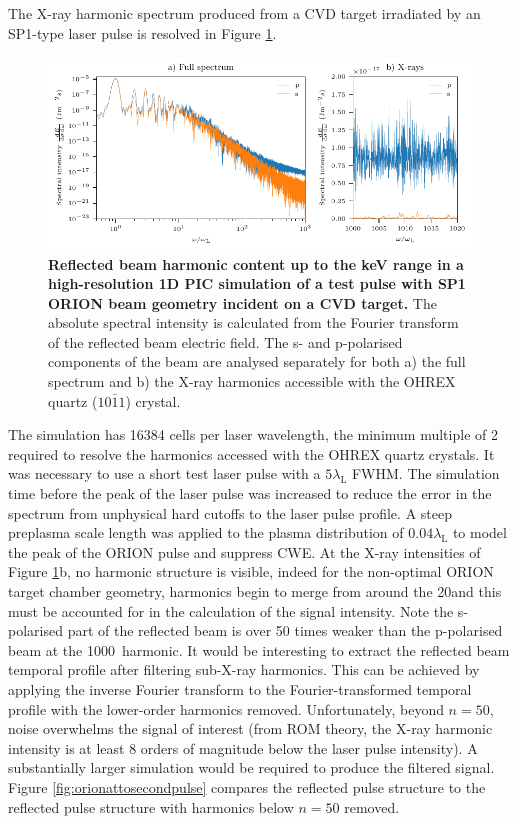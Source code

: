 The X-ray harmonic spectrum produced from a CVD target irradiated by an SP1-type laser pulse is resolved in Figure \ref{fig:orionxrayharmonics}.
\begin{figure}
	\centering
	\includegraphics{figures/orion/orion_xray_harmonics}
	\caption[Reflected beam harmonic content up to the keV range in a high-resolution 1D PIC simulation.]{\textbf{Reflected beam harmonic content up to the keV range in a high-resolution 1D PIC simulation of a test pulse with SP1 ORION beam geometry incident on a CVD target.} The absolute spectral intensity is calculated from the Fourier transform of the reflected beam electric field. The s- and p-polarised components of the beam are analysed separately for both a) the full spectrum and b) the X-ray harmonics accessible with the OHREX quartz ($10\bar{1}1$) crystal.}
	\label{fig:orionxrayharmonics}
\end{figure}
The simulation has 16384 cells per laser wavelength, the minimum multiple of 2 required to resolve the harmonics accessed with the OHREX quartz crystals. It was necessary to use a short test laser pulse with a $5\lambda_\mathrm{L}$ FWHM. The simulation time before the peak of the laser pulse was increased to reduce the error in the spectrum from unphysical hard cutoffs to the laser pulse profile. A steep preplasma scale length was applied to the plasma distribution of $0.04\lambda_\mathrm{L}$ to model the peak of the ORION pulse and suppress \ac{CWE}. 
At the X-ray intensities of Figure \ref{fig:orionxrayharmonics}b, no harmonic structure is visible, indeed for the non-optimal ORION target chamber geometry, harmonics begin to merge from around the 20\th and this must be accounted for in the calculation of the signal intensity. Note the s-polarised part of the reflected beam is over 50 times weaker than the p-polarised beam at the 1000\th\ harmonic.
It would be interesting to extract the reflected beam temporal profile after filtering sub-X-ray harmonics. This can be achieved by applying the inverse Fourier transform to the Fourier-transformed temporal profile with the lower-order harmonics removed. Unfortunately, beyond $n=50$, noise overwhelms the signal of interest (from ROM theory, the X-ray harmonic intensity is at least 8 orders of magnitude below the laser pulse intensity). A substantially larger simulation would be required to produce the filtered signal. Figure \ref{fig:orionattosecondpulse} compares the reflected pulse structure to the reflected pulse structure with harmonics below $n = 50$ removed. 
